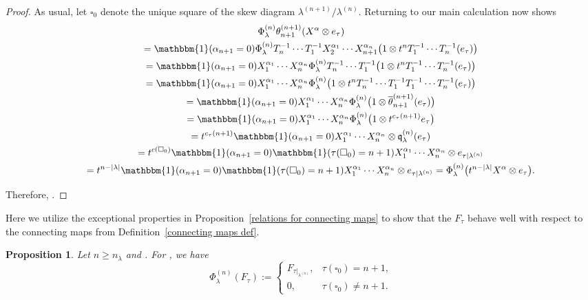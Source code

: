 \documentclass[pdftex]{sigma}
\numberwithin{equation}{section}
\newtheorem{Proposition}[Theorem]{Proposition}
\theoremstyle{definition}
\DeclareMathOperator{\PSYT}{\mathrm{PSYT}_{\geq 0}}
\begin{document}
\begin{proof}
As usual, let $\square_0$ denote the unique square of the skew diagram $\lambda^{(n+1)}/\lambda^{(n)}$. Returning to our main calculation now shows
\begin{gather*}
 \Phi^{(n)}_{\lambda} \theta_{n+1}^{(n+1)}(X^{\alpha} \otimes e_{\tau}) \\
 \qquad =\mathbbm{1}(\alpha_{n+1} =0)\Phi^{(n)}_{\lambda}T_n^{-1}\cdots T_1^{-1}X_2^{\alpha_1}\cdots X_{n+1}^{\alpha_n} \bigl(1\otimes t^nT_1^{-1}\cdots T_n^{-1}(e_{\tau})\bigr) \\
 \qquad = \mathbbm{1}(\alpha_{n+1} =0)X_1^{\alpha_1}\cdots X_{n}^{\alpha_{n}}\Phi^{(n)}_{\lambda}T_n^{-1}\cdots T_1^{-1} \bigl(1\otimes t^nT_1^{-1}\cdots T_n^{-1}(e_{\tau})\bigr) \\
 \qquad = \mathbbm{1}(\alpha_{n+1} =0)X_1^{\alpha_1}\cdots X_{n}^{\alpha_{n}}\Phi^{(n)}_{\lambda}\bigl(1 \otimes t^nT_n^{-1}\cdots T_1^{-1}T_1^{-1}\cdots T_n^{-1}(e_{\tau})\bigr) \\
 \qquad = \mathbbm{1}(\alpha_{n+1} =0)X_1^{\alpha_1}\cdots X_{n}^{\alpha_{n}}\Phi^{(n)}_{\lambda}\bigl(1 \otimes \overline{\theta}_{n+1}^{(n+1)}(e_{\tau})\bigr) \\
 \qquad = \mathbbm{1}(\alpha_{n+1} =0)X_1^{\alpha_1}\cdots X_{n}^{\alpha_{n}}\Phi^{(n)}_{\lambda}\bigl(1 \otimes t^{c_{\tau}(n+1)}e_{\tau}\bigr) \\
 \qquad = t^{c_{\tau}(n+1)}\mathbbm{1}(\alpha_{n+1} =0)X_1^{\alpha_1}\cdots X_{n}^{\alpha_{n}}\otimes \mathfrak{q}_{\lambda}^{(n)}(e_{\tau}) \\
 \qquad = t^{c(\square_0)}\mathbbm{1}(\alpha_{n+1} =0)\mathbbm{1}( \tau(\square_0) = n+1)X_1^{\alpha_1}\cdots X_{n}^{\alpha_{n}}\otimes e_{\tau|{\lambda^{(n)}}} \\
 \qquad = t^{n-|\lambda|} \mathbbm{1}(\alpha_{n+1} =0)\mathbbm{1}( \tau(\square_0) = n+1)X_1^{\alpha_1}\cdots X_{n}^{\alpha_{n}}\otimes e_{\tau|{\lambda^{(n)}}} = \Phi^{(n)}_{\lambda}\bigl(t^{n-|\lambda|}X^{\alpha}\otimes e_{\tau}\bigr).
\end{gather*}

Therefore,
.
\end{proof}

Here we utilize the exceptional properties in Proposition~\ref{relations for connecting maps} to show that the $F_{\tau}$ behave well with respect to the connecting maps  from Definition~\ref{connecting maps def}.

\begin{Proposition}\label{stability for locally maximal psyt}
 Let $n \geq n_{\lambda}$ and . For \smash{$\tau \in \PSYT\bigl(\lambda^{(n+1)}\bigr)$}, we have
 \[
 \Phi^{(n)}_{\lambda}(F_{\tau}) := \begin{cases}
 F_{\tau|_{\lambda^{(n)}}}, & \tau(\square_0) = n+1,\\
 0, & \tau(\square_0) \neq n+1.
 \end{cases}
 \]

\end{Proposition}
\end{document}

